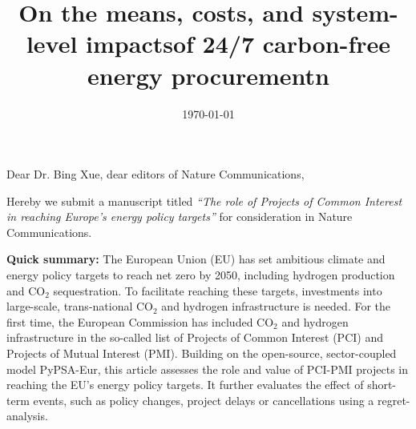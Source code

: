 \documentclass[10pt,a4paper,roman]{moderncv}        %
\title{On the means, costs, and system-level impactsof 24/7 carbon-free energy procurementn}
\begin{document}
\date{\today}
\opening{Dear Dr. Bing Xue, dear editors of Nature Communications,}
\makelettertitle
\justifying
Hereby we submit a manuscript titled \textit{\enquote{The role of Projects of Common Interest in reaching Europe's energy policy targets}} for consideration in Nature Communications. 

\textbf{Quick summary:} The European Union (EU) has set ambitious climate and energy policy targets to reach net zero by 2050, including hydrogen production and CO$_2$ sequestration. To facilitate reaching these targets, investments into large-scale, trans-national CO$_2$ and hydrogen infrastructure is needed. For the first time, the European Commission has included CO$_2$ and hydrogen infrastructure in the so-called list of Projects of Common Interest (PCI) and Projects of Mutual Interest (PMI). Building on the open-source, sector-coupled model PyPSA-Eur, this article assesses the role and value of PCI-PMI projects in reaching the EU's energy policy targets. It further evaluates the effect of short-term events, such as policy changes, project delays or cancellations using a regret-analysis.
\end{document}
